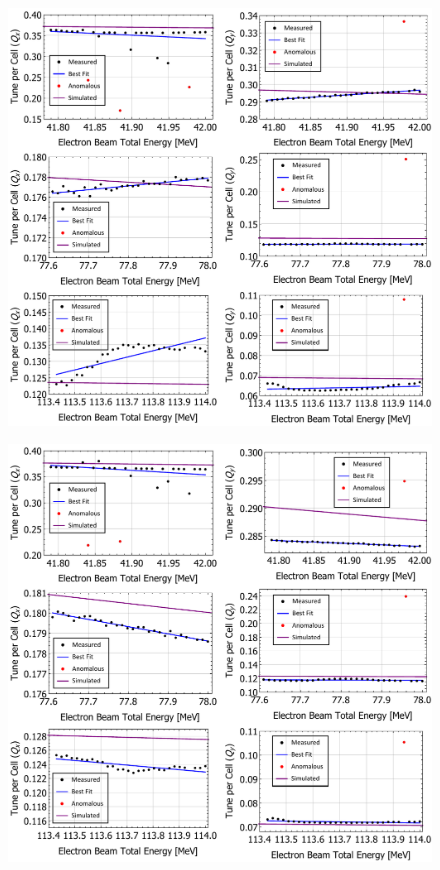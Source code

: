 \documentclass[../main.tex]{subfiles}
\begin{document}
\begin{figure}[!h]
\centering
\includegraphics[width=\textwidth]{Figures/CBETA_Multi-Pass_Commissioning/FB_analysed_3turn_tunes.pdf}
\caption{}
\label{fig:FB_analysed_tunes}
\end{figure}

\begin{figure}[!h]
\centering
\includegraphics[width=\textwidth]{Figures/CBETA_Multi-Pass_Commissioning/ZX_analysed_3turn_tunes.pdf}
\caption{}
\label{fig:ZX_analysed_tunes}
\end{figure}
\end{document}
